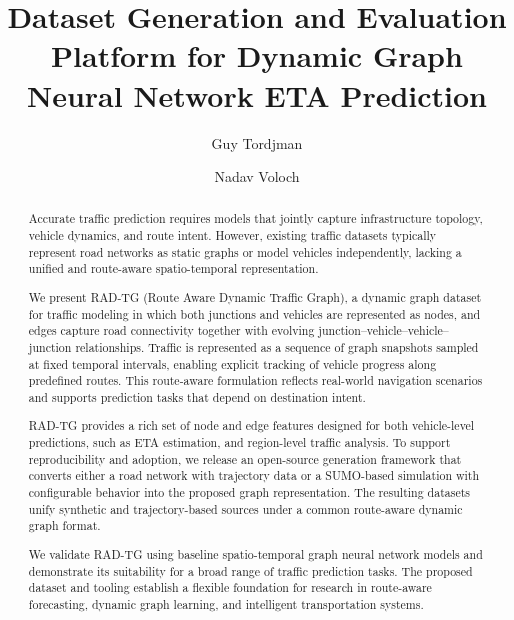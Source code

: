 \documentclass[runningheads]{template/llncs}
\begin{document}
\title{Dataset Generation and Evaluation Platform for Dynamic Graph Neural Network ETA Prediction}


\author{Guy Tordjman \and Nadav Voloch}



\maketitle

\begin{abstract}
Accurate traffic prediction requires models that jointly capture infrastructure topology, vehicle dynamics, and route intent. However, existing traffic datasets typically represent road networks as static graphs or model vehicles independently, lacking a unified and route-aware spatio-temporal representation.

We present RAD-TG (Route Aware Dynamic Traffic Graph), a dynamic graph dataset for traffic modeling in which both junctions and vehicles are represented as nodes, and edges capture road connectivity together with evolving junction--vehicle--vehicle--junction relationships. Traffic is represented as a sequence of graph snapshots sampled at fixed temporal intervals, enabling explicit tracking of vehicle progress along predefined routes. This route-aware formulation reflects real-world navigation scenarios and supports prediction tasks that depend on destination intent.

RAD-TG provides a rich set of node and edge features designed for both vehicle-level predictions, such as ETA estimation, and region-level traffic analysis. To support reproducibility and adoption, we release an open-source generation framework that converts either a road network with trajectory data or a SUMO-based simulation with configurable behavior into the proposed graph representation. The resulting datasets unify synthetic and trajectory-based sources under a common route-aware dynamic graph format.

We validate RAD-TG using baseline spatio-temporal graph neural network models and demonstrate its suitability for a broad range of traffic prediction tasks. The proposed dataset and tooling establish a flexible foundation for research in route-aware forecasting, dynamic graph learning, and intelligent transportation systems.
\end{abstract}
\end{document}
